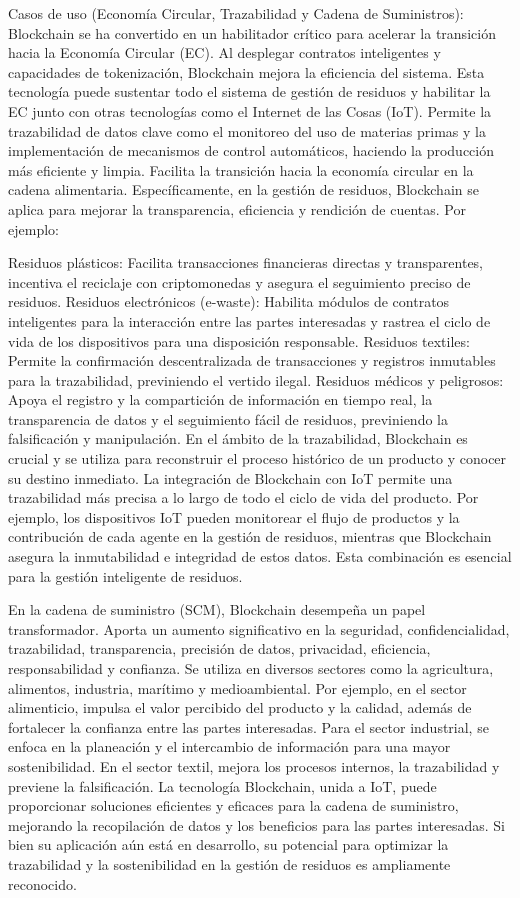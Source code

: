 Casos de uso (Economía Circular, Trazabilidad y Cadena de Suministros): Blockchain se ha convertido en un habilitador crítico para acelerar la transición hacia la Economía Circular (EC). Al desplegar contratos inteligentes y capacidades de tokenización, Blockchain mejora la eficiencia del sistema. Esta tecnología puede sustentar todo el sistema de gestión de residuos y habilitar la EC junto con otras tecnologías como el Internet de las Cosas (IoT). Permite la trazabilidad de datos clave como el monitoreo del uso de materias primas y la implementación de mecanismos de control automáticos, haciendo la producción más eficiente y limpia. Facilita la transición hacia la economía circular en la cadena alimentaria. Específicamente, en la gestión de residuos, Blockchain se aplica para mejorar la transparencia, eficiencia y rendición de cuentas. Por ejemplo:

Residuos plásticos: Facilita transacciones financieras directas y transparentes, incentiva el reciclaje con criptomonedas y asegura el seguimiento preciso de residuos.
Residuos electrónicos (e-waste): Habilita módulos de contratos inteligentes para la interacción entre las partes interesadas y rastrea el ciclo de vida de los dispositivos para una disposición responsable.
Residuos textiles: Permite la confirmación descentralizada de transacciones y registros inmutables para la trazabilidad, previniendo el vertido ilegal.
Residuos médicos y peligrosos: Apoya el registro y la compartición de información en tiempo real, la transparencia de datos y el seguimiento fácil de residuos, previniendo la falsificación y manipulación.
En el ámbito de la trazabilidad, Blockchain es crucial y se utiliza para reconstruir el proceso histórico de un producto y conocer su destino inmediato. La integración de Blockchain con IoT permite una trazabilidad más precisa a lo largo de todo el ciclo de vida del producto. Por ejemplo, los dispositivos IoT pueden monitorear el flujo de productos y la contribución de cada agente en la gestión de residuos, mientras que Blockchain asegura la inmutabilidad e integridad de estos datos. Esta combinación es esencial para la gestión inteligente de residuos.

En la cadena de suministro (SCM), Blockchain desempeña un papel transformador. Aporta un aumento significativo en la seguridad, confidencialidad, trazabilidad, transparencia, precisión de datos, privacidad, eficiencia, responsabilidad y confianza. Se utiliza en diversos sectores como la agricultura, alimentos, industria, marítimo y medioambiental. Por ejemplo, en el sector alimenticio, impulsa el valor percibido del producto y la calidad, además de fortalecer la confianza entre las partes interesadas. Para el sector industrial, se enfoca en la planeación y el intercambio de información para una mayor sostenibilidad. En el sector textil, mejora los procesos internos, la trazabilidad y previene la falsificación. La tecnología Blockchain, unida a IoT, puede proporcionar soluciones eficientes y eficaces para la cadena de suministro, mejorando la recopilación de datos y los beneficios para las partes interesadas. Si bien su aplicación aún está en desarrollo, su potencial para optimizar la trazabilidad y la sostenibilidad en la gestión de residuos es ampliamente reconocido.
